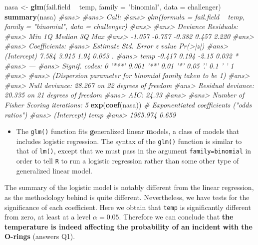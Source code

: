 \documentclass[]{book}
\newenvironment{Shaded}{\begin{snugshade}}{\end{snugshade}}
\newcommand{\KeywordTok}[1]{\textcolor[rgb]{0.13,0.29,0.53}{\textbf{#1}}}
\newcommand{\DataTypeTok}[1]{\textcolor[rgb]{0.13,0.29,0.53}{#1}}
\newcommand{\StringTok}[1]{\textcolor[rgb]{0.31,0.60,0.02}{#1}}
\newcommand{\CommentTok}[1]{\textcolor[rgb]{0.56,0.35,0.01}{\textit{#1}}}
\newcommand{\OperatorTok}[1]{\textcolor[rgb]{0.81,0.36,0.00}{\textbf{#1}}}
\newcommand{\NormalTok}[1]{#1}
\newenvironment{rmdblock}[1]
  {\begin{shaded*}
  \begin{itemize}
  \renewcommand{\labelitemi}{
    \raisebox{-.7\height}[0pt][0pt]{
      {\setkeys{Gin}{width=2em,keepaspectratio}\texttt{[image: img/icons/\#1]}}
    }
  }
  \item
  }
  {
  \end{itemize}
  \end{shaded*}
  }
\newenvironment{rmdtip}
  {\begin{rmdblock}{tip}}
  {\end{rmdblock}}
\theoremstyle{definition}
\theoremstyle{definition}
\theoremstyle{definition}
\theoremstyle{remark}
\begin{document}
\begin{Shaded}
\begin{Highlighting}[]
\NormalTok{nasa <-}\StringTok{ }\KeywordTok{glm}\NormalTok{(fail.field }\OperatorTok{~}\StringTok{ }\NormalTok{temp, }\DataTypeTok{family =} \StringTok{"binomial"}\NormalTok{, }\DataTypeTok{data =}\NormalTok{ challenger)}
\KeywordTok{summary}\NormalTok{(nasa)}
\CommentTok{#ans> }
\CommentTok{#ans> Call:}
\CommentTok{#ans> glm(formula = fail.field ~ temp, family = "binomial", data = challenger)}
\CommentTok{#ans> }
\CommentTok{#ans> Deviance Residuals: }
\CommentTok{#ans>    Min      1Q  Median      3Q     Max  }
\CommentTok{#ans> -1.057  -0.757  -0.382   0.457   2.220  }
\CommentTok{#ans> }
\CommentTok{#ans> Coefficients:}
\CommentTok{#ans>             Estimate Std. Error z value Pr(>|z|)  }
\CommentTok{#ans> (Intercept)    7.584      3.915    1.94    0.053 .}
\CommentTok{#ans> temp          -0.417      0.194   -2.15    0.032 *}
\CommentTok{#ans> ---}
\CommentTok{#ans> Signif. codes:  0 '***' 0.001 '**' 0.01 '*' 0.05 '.' 0.1 ' ' 1}
\CommentTok{#ans> }
\CommentTok{#ans> (Dispersion parameter for binomial family taken to be 1)}
\CommentTok{#ans> }
\CommentTok{#ans>     Null deviance: 28.267  on 22  degrees of freedom}
\CommentTok{#ans> Residual deviance: 20.335  on 21  degrees of freedom}
\CommentTok{#ans> AIC: 24.33}
\CommentTok{#ans> }
\CommentTok{#ans> Number of Fisher Scoring iterations: 5}
\KeywordTok{exp}\NormalTok{(}\KeywordTok{coef}\NormalTok{(nasa)) }\CommentTok{# Exponentiated coefficients ("odds ratios")}
\CommentTok{#ans> (Intercept)        temp }
\CommentTok{#ans>    1965.974       0.659}
\end{Highlighting}
\end{Shaded}

\begin{rmdtip}
The \texttt{glm()} function fits \textbf{g}eneralized \textbf{l}inear
\textbf{m}odels, a class of models that includes logistic regression.
The syntax of the \texttt{glm()} function is similar to that of
\texttt{lm()}, except that we must pass in the argument
\texttt{family=binomial} in order to tell \texttt{R} to run a logistic
regression rather than some other type of generalized linear model.
\end{rmdtip}

The summary of the logistic model is notably different from the linear
regression, as the methodology behind is quite different. Nevertheless,
we have tests for the significance of each coefficient. Here we obtain
that \texttt{temp} is significantly different from zero, at least at a
level \(\alpha=0.05\). Therefore we can conclude that \textbf{the
temperature is indeed affecting the probability of an incident with the
O-rings} (answers Q1).
\end{document}
